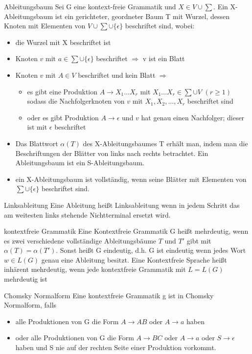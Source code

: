 \documentclass[avery5371]{flashcards}
\begin{document}
\begin{flashcard}[Definition]{Ableitungsbaum} Sei G eine kontext-freie Grammatik und $X\in V\cup \sum$. Ein X-Ableitungsbaum ist ein gerichteter, geordneter Baum T mit Wurzel, dessen Knoten mit Elementen von $V\cup\sum\cup\{\epsilon\}$ beschriftet sind, wobei:\begin{itemize}
\item die Wurzel mit X beschriftet ist
\item Knoten $v$ mit $a\in\sum\cup\{\epsilon\}$ beschriftet $\Rightarrow$ v ist ein Blatt
\item Knoten $v$ mit $A\in V$ beschriftet und kein Blatt $\Rightarrow$
    \begin{itemize}
\item es gibt eine Produktion $A\rightarrow X_1...X_r$ mit $X_1...X_r\in\sum\cup V$ $(r\geq 1)$ sodass die Nachfolgerknoten von $v$ mit $X_1,X_2,...,X_r$ beschriftet sind
\item oder es gibt Produktion $A\rightarrow \epsilon$ und $v$ hat genau einen Nachfolger; dieser ist mit $\epsilon$ beschriftet
\end{itemize}
\item Das Blattwort $\alpha(T)$ des X-Ableitungsbaumes T erhält man, indem man die Beschriftungen der Blätter von links nach rechts betrachtet. Ein Ableitungsbaum ist ein S-Ableitungsbaum.
\item ein X-Ableitungsbaum ist vollständig, wenn seine Blätter mit Elementen von $\sum\cup\{\epsilon\}$ beschriftet sind.
\end{itemize}
\end{flashcard}

\begin{flashcard}[Definition]{Linksableitung} Eine Ableitung heißt Linksableitung wenn in jedem Schritt das am weitesten links stehende Nichtterminal ersetzt wird.
\end{flashcard}

\begin{flashcard}[Definition]{kontextfreie Grammatik}
     Eine Kontextfreie Grammatik G heißt mehrdeutig, wenn es zwei verschiedene vollständige Ableitungsbäume $T$ und $T'$ gibt mit $\alpha(T)=\alpha(T')$.
 Sonst heißt G eindeutig, d.h. G ist eindeutig wenn jedes Wort $w\in L(G)$ genau eine Ableitung besitzt.
 Eine Kontextfreie Sprache heißt inhärent mehrdeutig, wenn jede kontextfreie Grammatik mit $L=L(G)$ mehrdeutig ist
\end{flashcard}

\begin{flashcard}[Definition]{Chomsky Normalform} Eine kontextfreie Grammatik g ist in Chomsky Normalform, falls\begin{itemize}
\item alle Produktionen von G die Form $A\rightarrow AB$ oder $A\rightarrow a$ haben
\item oder alle Produktionen von G die Form $A\rightarrow BC$ oder $A\rightarrow a$ oder $S\rightarrow\epsilon$ haben und S nie auf der rechten Seite einer Produktion vorkommt.
\end{itemize}
\end{flashcard}
\end{document}
